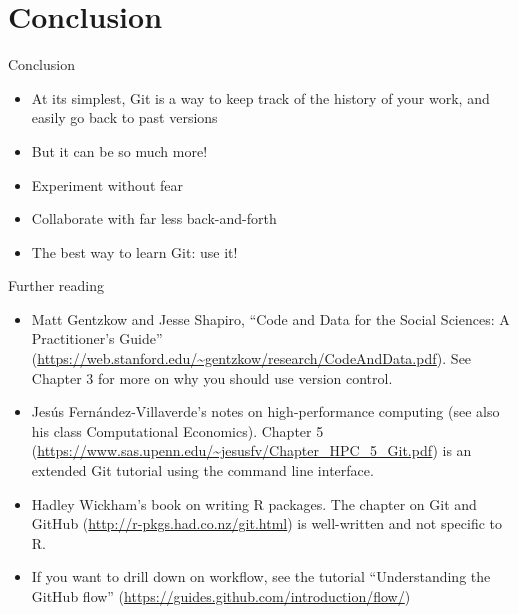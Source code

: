 \documentclass{beamer}
\begin{document}
\section*{Conclusion}

\begin{frame}{Conclusion}
\begin{itemize}
\item At its simplest, Git is a way to keep track of the history of your work, and easily go back to past versions
\item But it can be so much more!
\item Experiment without fear
\item Collaborate with far less back-and-forth
\item The best way to learn Git: use it!
\end{itemize}

\end{frame}

\begin{frame}{Further reading}
\begin{itemize}
\item Matt Gentzkow and Jesse Shapiro, ``Code and Data for the Social Sciences: A Practitioner’s Guide'' (\url{https://web.stanford.edu/~gentzkow/research/CodeAndData.pdf}). See Chapter 3 for more on why you should use version control.
\item Jes\'us Fern\'andez-Villaverde's notes on high-performance computing (see also his class Computational Economics). Chapter 5 (\url{https://www.sas.upenn.edu/~jesusfv/Chapter_HPC_5_Git.pdf}) is an extended Git tutorial using the command line interface.
\item Hadley Wickham's book on writing R packages. The chapter on Git and GitHub (\url{http://r-pkgs.had.co.nz/git.html}) is well-written and not specific to R.
\item If you want to drill down on workflow, see the tutorial ``Understanding the GitHub flow'' (\url{https://guides.github.com/introduction/flow/})
\end{itemize}
\end{frame}
\end{document}
